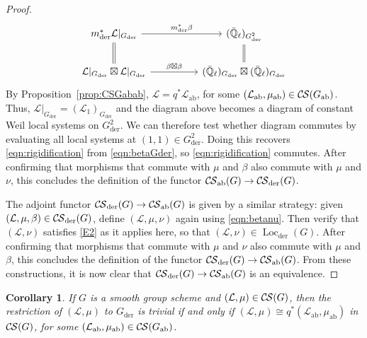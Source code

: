 \documentclass[10pt]{amsart}
\theoremstyle{plain}
\newtheorem{corollary}[theorem]{Corollary}
\theoremstyle{definition}
\newcommand{\EE}{\mathbb{\bar Q}_\ell}
\DeclareMathOperator{\Loc}{Loc}
\newcommand{\der}{_{\operatorname{der}}}
\newcommand{\ab}{_{\operatorname{ab}}}
\newcommand{\cs}[1]{{\mathcal{#1}}}
\newcommand{\CS}{{\mathcal{C\hskip-0.8pt S}}}
\begin{document}
\begin{proof}
\begin{equation}\label{eqn:betaGder}
\begin{tikzcd}
m\der^*\cs{L}\vert_{G\der} \arrow{rr}{m\der^* \beta} \arrow[equal]{d} && \arrow[equal]{d} (\EE)_{G\der^2}\\
\cs{L}\vert_{G\der} \boxtimes \cs{L}\vert_{G\der} \arrow{rr}{\beta\boxtimes\beta} &&  (\EE)_{G\der}\boxtimes (\EE)_{G\der} 
\end{tikzcd}
\end{equation}
By Proposition~\ref{prop:CSGabab}, $\cs{L} = q^*\cs{L}\ab$, for some $(\cs{L}\ab,\mu\ab)\in \CS(G\ab)$.
Thus, $\cs{L}\vert_{G\der} = (\cs{L}_1)_{G\der}$ and the diagram above becomes a diagram of constant Weil local systems on $G\der^2$.
We can therefore test  whether  diagram commutes by evaluating all local systems at $(1,1)\in G\der^2$.  Doing this recovers \eqref{eqn:rigidification} from \eqref{eqn:betaGder}, so \eqref{eqn:rigidification} commutes.
%
After confirming that morphisms that commute with $\mu$ and $\beta$ also commute with $\mu$ and $\nu$, this concludes the definition of the functor  $\CS\ab(G) \to \CS\der(G)$.


The adjoint functor $\CS\der(G) \to \CS\ab(G)$ is given by a  similar  strategy: given $(\cs{L},\mu,\beta)\in \CS\der(G)$, define $(\cs{L},\mu,\nu)$ again using  \eqref{eqn:betanu}.
Then verify that $(\cs{L},\nu)$ satisfies \eqref{E2} as it applies here, so that $(\cs{L},\nu)\in \Loc\der(G)$.
After confirming that morphisms that commute with $\mu$ and $\nu$ also commute with $\mu$ and $\beta$, this concludes the definition of the functor  $\CS\der(G) \to \CS\ab(G)$.
From these constructions,  it is now clear that $\CS\der(G) \to \CS\ab(G)$ is an equivalence.
\end{proof}

\begin{corollary} 
If $G$ is a smooth group scheme and $(\cs{L},\mu) \in \CS(G)$, then
the restriction of $(\cs{L},\mu)$ to $G\der$ is trivial if and only if $(\cs{L},\mu) \cong q^*(\cs{L}\ab,\mu\ab)$ in $\CS(G)$, for some $(\cs{L}\ab,\mu\ab) \in \CS(G\ab)$.
\end{corollary}
\end{document}
